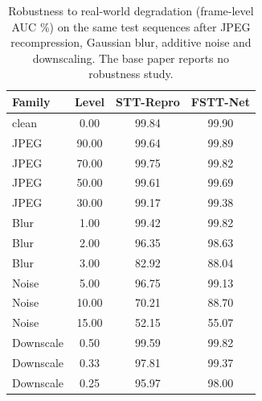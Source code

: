 \begin{table}[!t]
\centering
\caption{Robustness to real-world degradation (frame-level AUC \%) on the same test sequences after JPEG recompression, Gaussian blur, additive noise and downscaling. The base paper reports no robustness study.}
\label{tab:tableX_robustness}
\footnotesize
\begin{tabular}{lccc}
\hline\hline
Family & Level & STT-Repro & FSTT-Net \\
\hline
clean & 0.00 & 99.84 & 99.90 \\
JPEG & 90.00 & 99.64 & 99.89 \\
JPEG & 70.00 & 99.75 & 99.82 \\
JPEG & 50.00 & 99.61 & 99.69 \\
JPEG & 30.00 & 99.17 & 99.38 \\
Blur & 1.00 & 99.42 & 99.82 \\
Blur & 2.00 & 96.35 & 98.63 \\
Blur & 3.00 & 82.92 & 88.04 \\
Noise & 5.00 & 96.75 & 99.13 \\
Noise & 10.00 & 70.21 & 88.70 \\
Noise & 15.00 & 52.15 & 55.07 \\
Downscale & 0.50 & 99.59 & 99.82 \\
Downscale & 0.33 & 97.81 & 99.37 \\
Downscale & 0.25 & 95.97 & 98.00 \\
\hline\hline
\end{tabular}
\end{table}
